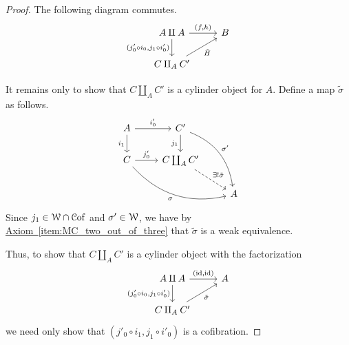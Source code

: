 \documentclass[main.tex]{subfiles}
\begin{document}
\begin{proof}
  The following diagram commutes.
  \begin{equation*}
    \begin{tikzcd}
      A \amalg A
      \arrow[r, "{(f, h)}"]
      \arrow[d, swap, "{(j_{0}' \circ i_{0}, j_{1} \circ i_{0}')}"]
      & B
      \\
      C \amalg_{A} C'
      \arrow[ur, swap, "\tilde{H}"]
    \end{tikzcd}
  \end{equation*}

  It remains only to show that $C \amalg_{A} C'$ is a cylinder object for $A$. Define a map $\tilde{\sigma}$ as follows.
  \begin{equation*}
    \begin{tikzcd}
      A
      \arrow[r, "i_{0}'"]
      \arrow[d, swap, "i_{1}"]
      & C'
      \arrow[d, swap, "j_{1}"]
      \arrow[ddr, bend left, "\sigma'"]
      \\
      C
      \arrow[r, "j_{0}'"]
      \arrow[drr, swap, bend right, "\sigma"]
      & C \coprod_{A} C'
      \arrow[dr, dashed, "\exists!\tilde{\sigma}"]
      \\
      && A
    \end{tikzcd}
  \end{equation*}
  Since $j_{1} \in \mathcal{W} \cap \mathcal{C}\mathrm{of}$ and $\sigma' \in \mathcal{W}$, we have by \hyperref[item:MC_two_out_of_three]{Axiom~\ref*{item:MC_two_out_of_three}} that $\tilde{\sigma}$ is a weak equivalence.

  Thus, to show that $C \amalg_{A} C'$ is a cylinder object with the factorization
  \begin{equation*}
    \begin{tikzcd}
      A \amalg A
      \arrow[r, "{(\id, \id)}"]
      \arrow[d, swap, "{(j_{0}' \circ i_{0}, j_{1} \circ i_{0}')}"]
      & A
      \\
      C \amalg_{A} C'
      \arrow[ur, swap, "\tilde{\sigma}"]
    \end{tikzcd}
  \end{equation*}
  we need only show that $(j'_{0} \circ i_{1}, j_{1} \circ i'_{0})$ is a cofibration.


\end{proof}
\end{document}
